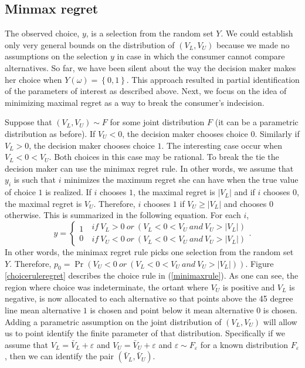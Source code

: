 \documentclass{article}
\begin{document}
\subsection{Minmax regret}

The observed choice, $y$, is a selection from the random set $Y$. We could
establish only very general bounds on the distribution of $\left(
V_{L},V_{U}\right) $ because we made no assumptions on the selection $y$ in
case in which the consumer cannot compare alternatives. So far, we have been
silent about the way the decision maker makes her choice when $Y\left(
\omega \right) =\left\{ 0,1\right\} $. This approach resulted in partial
identification of the parameters of interest as described above. Next, we
focus on the idea of minimizing maximal regret as a way to break the
consumer's indecision.

Suppose that $\left( V_{L},V_{U}\right) \sim F$ for some joint distribution $%
F$ (it can be a parametric distribution as before). If $V_{U}<0$, the
decision maker chooses choice $0.$ Similarly if $V_{L}>0$, the decision
maker chooses choice $1$. The interesting case occur when $V_{L}<0<V_{U}$.
Both choices in this case may be rational. To break the tie the decision
maker can use the minimax regret rule. In other words, we assume that $y_{i}$
is such that $i$ minimizes the maximum regret she can have when the true
value of choice $1$ is realized. If $i$ chooses $1$, the maximal regret is $%
\left\vert V_{L}\right\vert $ and if $i$ chooses $0$, the maximal regret is $%
V_{U}$. Therefore, $i$ chooses $1$ if $V_{U}\geq \left\vert V_{L}\right\vert 
$ and chooses $0$ otherwise. This is summarized in the following equation.
For each $i$,%
\begin{equation}
y=\left\{ 
\begin{array}{c}
1 \\ 
0%
\end{array}%
\ 
\begin{array}{c}
if\ V_{L}>0\ or\ (V_{L}<0<V_{U}\ and\ V_{U}>|V_{L}|) \\ 
if\ V_{U}<0\ or\ (V_{L}<0<V_{U}\ and\ V_{U}>|V_{L}|)%
\end{array}%
\right. .  \label{minimaxrule}
\end{equation}%
In other words, the minimax regret rule picks one selection from the random
set $Y$. Therefore, $p_{0}=\Pr \left( V_{U}<0\ or\ (V_{L}<0<V_{U}\ and\
V_{U}>|V_{L}|)\right) $. Figure \ref{choiceruleregret} describes the choice
rule in (\ref{minimaxrule}). As one can see, the region where choice was
indeterminate, the ortant where $V_{U}$ is positive and $V_{L}$ is negative,
is now allocated to each alternative so that points above the 45 degree line
mean alternative $1$ is chosen and point below it mean alternative $0$ is
chosen. Adding a parametric assumption on the joint distribution of $\left(
V_{L},V_{U}\right) $ will allow us to point identify the finite parameter of
that distribution. Specifically if we assume that $V_{L}=\bar{V}%
_{L}+\varepsilon $ and $V_{U}=\bar{V}_{U}+\varepsilon $ and $\varepsilon
\sim F_{\varepsilon }$ for a known distribution $F_{\varepsilon }$, then we
can identify the pair $\left( \bar{V}_{L},\bar{V}_{U}\right) $.
\end{document}

